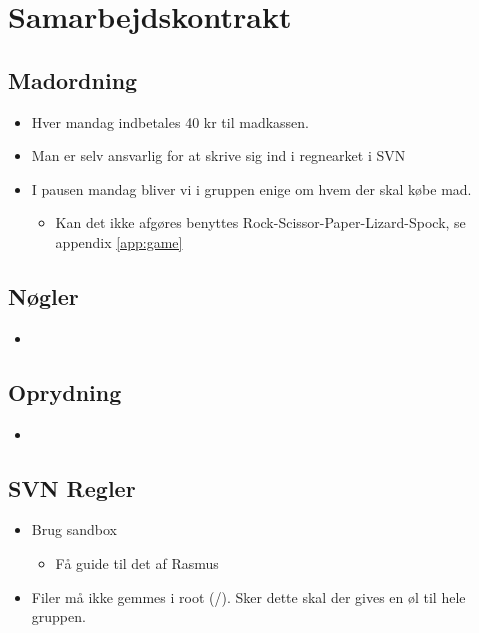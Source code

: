 \documentclass{article}
\begin{document}
\section{Samarbejdskontrakt}
\subsection{Madordning}
\begin{itemize}
	\item Hver mandag indbetales 40 kr til madkassen.
	\item Man er selv ansvarlig for at skrive sig ind i regnearket i SVN
	\item I pausen mandag bliver vi i gruppen enige om hvem der skal købe mad.
	
	\begin{itemize}
		\item Kan det ikke afgøres benyttes Rock-Scissor-Paper-Lizard-Spock, se appendix \ref{app:game}
	\end{itemize}
\end{itemize}

\subsection{Nøgler}
\begin{itemize}
	\item 
\end{itemize}

\subsection{Oprydning}
\begin{itemize}
	\item 
\end{itemize}

\subsection{SVN Regler}
\begin{itemize}
	\item Brug sandbox
	\begin{itemize}
		\item Få guide til det af Rasmus
	\end{itemize}
	\item Filer m\aa{} ikke gemmes i root (/). Sker dette skal der gives en \o{}l til hele gruppen.  
\end{itemize}
\end{document}
